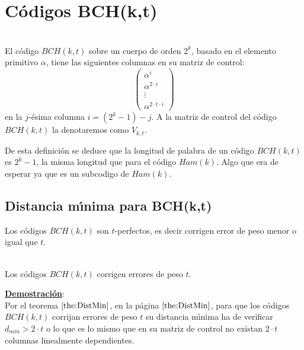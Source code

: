 %
%

%
\newpage
%
\section{C\'odigos BCH(k,t)}

\begin{definicion}
\ \\
El c\'odigo $BCH(k,t)$ sobre un cuerpo de orden $2^k$, basado en el elemento
primitivo $\alpha$, tiene las siguientes columnas en su matriz de control: 
\begin{displaymath}
\left( \begin{array}{c}
\alpha^i\\
\alpha^{2\cdot i}\\
\vdots\\
\alpha^{2\cdot t\cdot i}
\end{array} \right)
\end{displaymath}
en la $j$-\'esima columna $i=(2^k-1)-j$. A la matriz de control del c\'odigo
$BCH(k,t)$ la denotaremos como $V_{k,t}$.
\end{definicion}
De esta definici\'on se deduce que la longitud de palabra de un c\'odigo
$BCH(k,t)$ es $2^k-1$, la misma longitud que para el c\'odigo $Ham(k)$. Algo 
que era de esperar ya que es un subcodigo de $Ham(k)$.

\subsection{Distancia m\'{\i}nima para BCH(k,t)}

Los c\'odigos $BCH(k,t)$ son $t$-perfectos, es decir corrigen error de peso
menor o igual que $t$.

\begin{teorema}
\ \\
Los c\'odigos $BCH(k,t)$ corrigen errores de peso $t$.
\end{teorema}
\underline{\textbf{Demostraci\'on}}:\\
Por el teorema $\ref{the:DistMin}$, en la p\'agina $\pageref{the:DistMin}$,
para que los c\'odigos $BCH(k,t)$ corrijan errores de peso $t$ su distancia
m\'{\i}nima ha de verificar $d_{min}> 2\cdot t$ o lo que es lo mismo que en
su matriz de control no existan $2\cdot t$ columnas linealmente dependientes.\\


